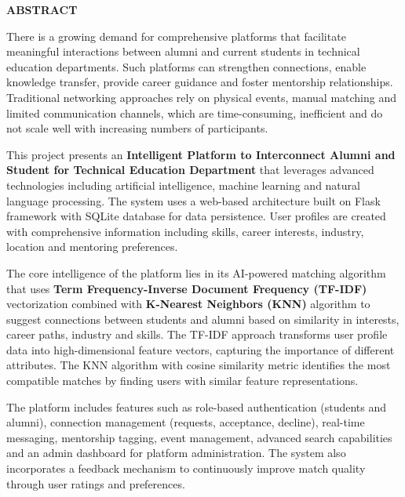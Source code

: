 \documentclass[12pt,a4paper]{report}
\begin{document}
\clearpage
\thispagestyle{plain}
\begin{center}
{\large\bfseries ABSTRACT}\\[0.8cm]
\end{center}

\noindent
There is a growing demand for comprehensive platforms that facilitate meaningful interactions between alumni and current students in technical education departments. Such platforms can strengthen connections, enable knowledge transfer, provide career guidance and foster mentorship relationships. Traditional networking approaches rely on physical events, manual matching and limited communication channels, which are time-consuming, inefficient and do not scale well with increasing numbers of participants.

\medskip

\noindent
This project presents an \textbf{Intelligent Platform to Interconnect Alumni and Student for Technical Education Department} that leverages advanced technologies including artificial intelligence, machine learning and natural language processing. The system uses a web-based architecture built on Flask framework with SQLite database for data persistence. User profiles are created with comprehensive information including skills, career interests, industry, location and mentoring preferences.

\medskip

\noindent
The core intelligence of the platform lies in its AI-powered matching algorithm that uses \textbf{Term Frequency-Inverse Document Frequency (TF-IDF)} vectorization combined with \textbf{K-Nearest Neighbors (KNN)} algorithm to suggest connections between students and alumni based on similarity in interests, career paths, industry and skills. The TF-IDF approach transforms user profile data into high-dimensional feature vectors, capturing the importance of different attributes. The KNN algorithm with cosine similarity metric identifies the most compatible matches by finding users with similar feature representations.

\medskip

\noindent
The platform includes features such as role-based authentication (students and alumni), connection management (requests, acceptance, decline), real-time messaging, mentorship tagging, event management, advanced search capabilities and an admin dashboard for platform administration. The system also incorporates a feedback mechanism to continuously improve match quality through user ratings and preferences.
\end{document}
